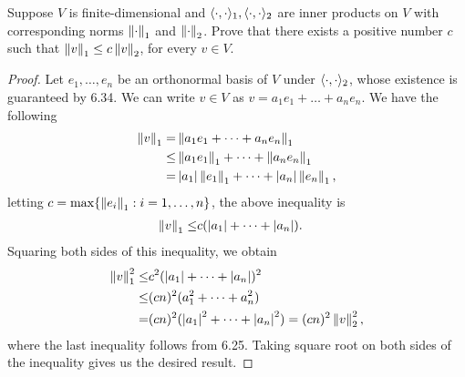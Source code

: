 \begin{exercise}{12}
  Suppose $V$ is finite-dimensional and $\langle \cdot,\cdot\rangle_1, \langle \cdot,\cdot\rangle_2$ are inner products on $V$ with corresponding norms $\left\lVert \cdot\right\rVert_1$ and $\left\lVert \cdot\right\rVert_2$. Prove that there exists a positive number $c$ such that $\left\lVert v\right\rVert_1\leq c\left\lVert v\right\rVert_2$, for every $v\in V$.
\end{exercise}
\begin{proof}
 Let $e_1,\dots,e_n$ be an orthonormal basis of $V$ under $\langle \cdot,\cdot\rangle_2$, whose existence is guaranteed by 6.34. We can write $v\in V$ as $v=a_1e_1+\dots+a_ne_n$. We have the following
 \begin{align*}
     \left\lVert v\right\rVert_1 =& \left\lVert a_1e_1+\dots+a_ne_n\right\rVert_1\\
     \leq& \left\lVert a_1e_1\right\rVert_1+\dots+\left\lVert a_ne_n\right\rVert_1\\
     =& \left\lvert a_1\right\rvert\left\lVert e_1\right\rVert_1+\dots+\left\lvert a_n\right\rvert\left\lVert e_n\right\rVert_1,
 \end{align*}
 letting $c=\max\{\left\lVert e_i\right\rVert_1:i=1,\dots,n\}$, the above inequality is
 \begin{align*}
     \left\lVert v\right\rVert_1 \leq& c(\left\lvert a_1\right\rvert+\dots+\left\lvert a_n\right\rvert).
 \end{align*}
 Squaring both sides of this inequality, we obtain
 \begin{align*}
     \left\lVert v\right\rVert_1^2 \leq& c^2(\left\lvert a_1\right\rvert+\dots+\left\lvert a_n\right\rvert)^2\\
     \leq& (cn)^2(a_1^2+\dots+a_n^2)\\
     =& (cn)^2(\left\lvert a_1\right\rvert^2+\dots+\left\lvert a_n\right\rvert^2) = (cn)^2\left\lVert v\right\rVert_2^2,
 \end{align*}
 where the last inequality follows from 6.25. Taking square root on both sides of the inequality gives us the desired result.
\end{proof}

